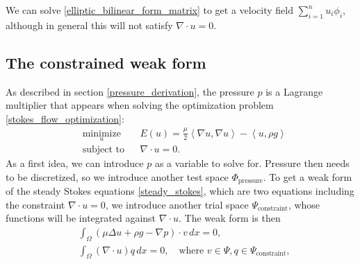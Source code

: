 \documentclass[11pt,a4paper]{memoir}
\newcommand{\inner}[1]{\left<#1\right>}
\newcommand{\om}{{\Omega}}
\begin{document}
We can solve \eqref{elliptic_bilinear_form_matrix} to get a velocity field $\sum_{i=1}^n u_i\phi_i$, although in general this will not satisfy $\nabla\cdot u = 0$.

\subsection{The constrained weak form}
As described in section \ref{pressure_derivation}, the pressure $p$ is a Lagrange multiplier that appears
when solving the optimization problem \eqref{stokes_flow_optimization}:
\begin{equation*}
\begin{aligned}
& \underset{u}{\text{minimize}}
& & E(u) =  \frac{\mu}{2} \inner{\nabla u, \nabla u} - \inner{u, \rho g}\\
& \text{subject to}
& & \nabla\cdot u = 0.
\end{aligned}
\end{equation*}
\newcommand{\trialconstraint}{{\Psi_{\text{constraint}}}}
\newcommand{\testpressure}{{\Phi_{\text{pressure}}}}
As a first idea, we can introduce $p$ as a variable to solve for.
Pressure then needs to be discretized, so we introduce another test space $\testpressure$.
To get a weak form of the steady Stokes equations \eqref{steady_stokes}, which are two equations including the constraint $\nabla\cdot u = 0$, we introduce
another trial space $\trialconstraint$, whose functions will be integrated against $\nabla\cdot u$. The weak form is then
\begin{equation*}
\begin{split}
    &\int_\om \left(\mu\Delta u + \rho g - \nabla p\right)\cdot v\,dx = 0,\\
    &\int_\om \left(\nabla\cdot u\right) q\,dx = 0, \quad\text{where $v \in \Psi, q \in \trialconstraint$},
\end{split}
\end{equation*}
\end{document}
